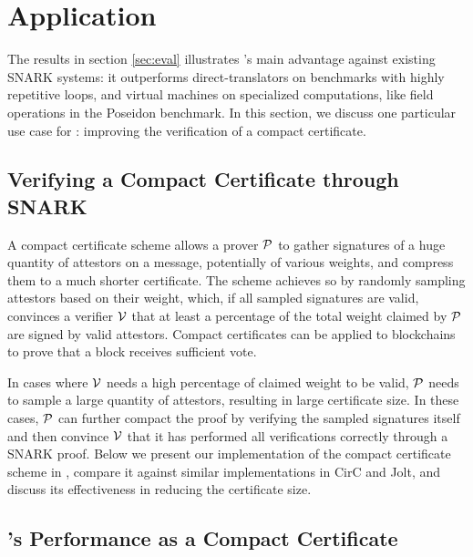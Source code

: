 \section{Application}

The results in section \ref{sec:eval} illustrates \CoBBl's main advantage against existing SNARK systems: it outperforms direct-translators on benchmarks with highly repetitive\red{[?]} loops, and virtual machines on specialized computations, like field operations in the Poseidon benchmark. In this section, we discuss one particular use case for \CoBBl: improving the verification of a compact certificate\cite{micali20compact}.

\subsection{Verifying a Compact Certificate through SNARK}
A compact certificate scheme\cite{micali20compact} allows a prover $\P$ to gather signatures of a huge quantity of attestors on a message, potentially of various weights, and compress them to a much shorter certificate. The scheme achieves so by randomly sampling attestors based on their weight, which, if all sampled signatures are valid, convinces a verifier $\V$ that at least a percentage of the total weight claimed by $\P$ are signed by valid attestors. Compact certificates can be applied to blockchains to prove that a block receives sufficient vote.

In cases where $\V$ needs a high percentage of claimed weight to be valid, $\P$ needs to sample a large quantity of attestors, resulting in large certificate size. In these cases, $\P$ can further compact the proof by verifying the sampled signatures itself and then convince $\V$ that it has performed all verifications correctly through a SNARK proof. Below we present our implementation of the compact certificate scheme in \CoBBl, compare it against similar implementations in CirC and Jolt, and discuss its effectiveness in reducing the certificate size.

\subsection{\CoBBl's Performance as a Compact Certificate}
